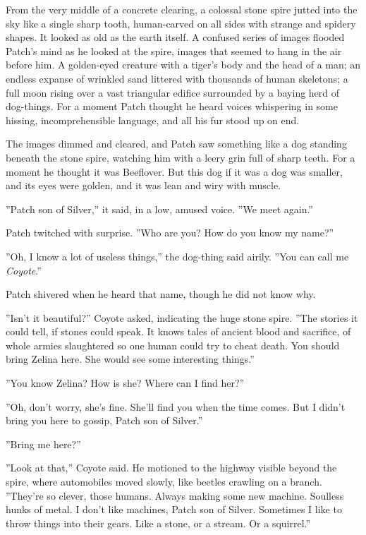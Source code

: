 \documentclass[11pt]{article}
\begin{document}
 From the very middle of a concrete clearing, a colossal stone spire jutted into the sky like a single sharp tooth, human-carved on all sides with strange and spidery shapes. It looked as old as the earth itself. A confused series of images flooded Patch's mind as he looked at the spire, images that seemed to hang in the air before him. A golden-eyed creature with a tiger's body and the head of a man; an endless expanse of wrinkled sand littered with thousands of human skeletons; a full moon rising over a vast triangular edifice surrounded by a baying herd of dog-things. For a moment Patch thought he heard voices whispering in some hissing, incomprehensible language, and all his fur stood up on end.\par
 The images dimmed and cleared, and Patch saw something like a dog standing beneath the stone spire, watching him with a leery grin full of sharp teeth. For a moment he thought it was Beeflover. But this dog %
 if it was a dog %
 was smaller, and its eyes were golden, and it was lean and wiry with muscle.\par
 ''Patch son of Silver,'' it said, in a low, amused voice. ''We meet again.''\par
 Patch twitched with surprise. ''Who are you? How do you know my name?''\par
 ''Oh, I know a lot of useless things,'' the dog-thing said airily. ''You can call me {\it Coyote}.''\par
 Patch shivered when he heard that name, though he did not know why.\par
 ''Isn't it beautiful?'' Coyote asked, indicating the huge stone spire. ''The stories it could tell, if stones could speak. It knows tales of ancient blood and sacrifice, of whole armies slaughtered so one human could try to cheat death. You should bring Zelina here. She would see some interesting things.''\par
 ''You know Zelina? How is she? Where can I find her?''\par
 ''Oh, don't worry, she's fine. She'll find you when the time comes. But I didn't bring you here to gossip, Patch son of Silver.''\par
 ''Bring me here?''\par
 ''Look at that,'' Coyote said. He motioned to the highway visible beyond the spire, where automobiles moved slowly, like beetles crawling on a branch. ''They're so clever, those humans. Always making some new machine. Soulless hunks of metal. I don't like machines, Patch son of Silver. Sometimes I like to throw things into their gears. Like a stone, or a stream. Or a squirrel.''\par
\end{document}
